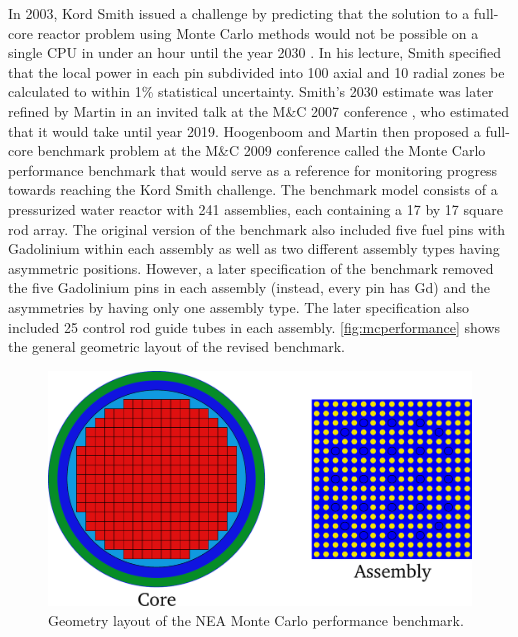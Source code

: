 In 2003, Kord Smith issued a challenge by predicting that the solution to a
full-core reactor problem using Monte Carlo methods would not be possible on a
single CPU in under an hour until the year 2030 \cite{mc-smith-2003}. In his
lecture, Smith specified that the local power in each pin subdivided into 100
axial and 10 radial zones be calculated to within 1\% statistical uncertainty.
Smith's 2030 estimate was later refined by Martin in an invited talk at the M\&C
2007 conference \cite{mc-martin-2007}, who estimated that it would take until
year 2019. Hoogenboom and Martin then proposed a full-core benchmark problem
\cite{mc-hoogenboom-2009} at the M\&C 2009 conference called the Monte Carlo
performance benchmark that would serve as a reference for monitoring progress
towards reaching the Kord Smith challenge. The benchmark model consists of a
pressurized water reactor with 241 assemblies, each containing a 17 by 17 square
rod array. The original version of the benchmark also included five fuel pins
with Gadolinium within each assembly as well as two different assembly types
having asymmetric positions. However, a later specification of the benchmark
\cite{mc-hoogenboom-2011} removed the five Gadolinium pins in each assembly
(instead, every pin has Gd) and the asymmetries by having only one assembly
type. The later specification also included 25 control rod guide tubes in each
assembly. \autoref{fig:mcperformance} shows the general geometric layout of the
revised benchmark.
\begin{figure}
  \centering
  \includegraphics[width=5.0in]{figures/ch1/mcperformance.pdf}
  \caption{Geometry layout of the NEA Monte Carlo performance benchmark.}
  \label{fig:mcperformance}
\end{figure}

